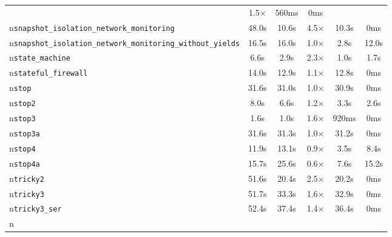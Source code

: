 \begin{tabular}{lccccc}
& 1.5× & 560ms & 0ms \\n\texttt{snapshot\_isolation\_network\_monitoring} & 48.0s & 10.6s & 4.5× & 10.3s & 0ms \\n\texttt{snapshot\_isolation\_network\_monitoring\_without\_yields} & 16.5s & 16.0s & 1.0× & 2.8s & 12.0s \\n\texttt{state\_machine} & 6.6s & 2.9s & 2.3× & 1.0s & 1.7s \\n\texttt{stateful\_firewall} & 14.0s & 12.9s & 1.1× & 12.8s & 0ms \\n\texttt{stop} & 31.6s & 31.0s & 1.0× & 30.9s & 0ms \\n\texttt{stop2} & 8.0s & 6.6s & 1.2× & 3.3s & 2.6s \\n\texttt{stop3} & 1.6s & 1.0s & 1.6× & 920ms & 0ms \\n\texttt{stop3a} & 31.6s & 31.3s & 1.0× & 31.2s & 0ms \\n\texttt{stop4} & 11.9s & 13.1s & 0.9× & 3.5s & 8.4s \\n\texttt{stop4a} & 15.7s & 25.6s & 0.6× & 7.6s & 15.2s \\n\texttt{tricky2} & 51.6s & 20.4s & 2.5× & 20.2s & 0ms \\n\texttt{tricky3} & 51.7s & 33.3s & 1.6× & 32.9s & 0ms \\n\texttt{tricky3\_ser} & 52.4s & 37.4s & 1.4× & 36.4s & 0ms \\n\bottomrule
\end{tabular}
